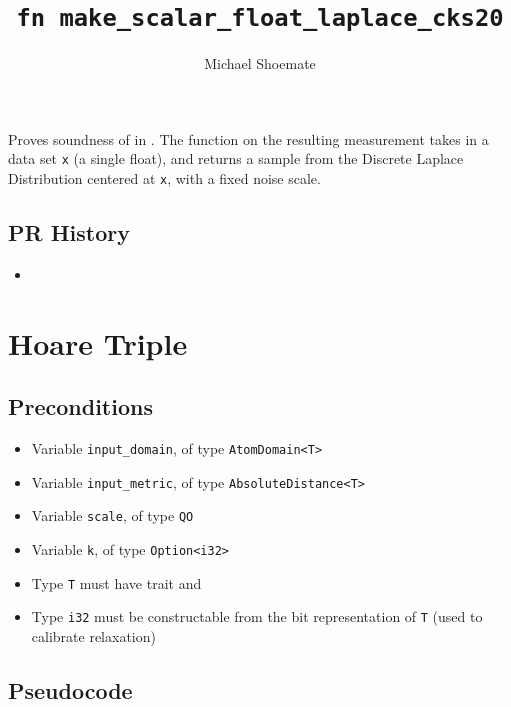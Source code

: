 \documentclass{article}
\title{\texttt{fn make\_scalar\_float\_laplace\_cks20}}
\author{Michael Shoemate}
\begin{document}
\maketitle

\contrib

Proves soundness of  in .
The function on the resulting measurement takes in a data set \texttt{x} (a single float), 
and returns a sample from the Discrete Laplace Distribution centered at \texttt{x}, with a fixed noise scale.

\subsection*{PR History}
\begin{itemize}
    \item {}
\end{itemize}

\section{Hoare Triple}

\subsection*{Preconditions}
\begin{itemize}
    \item Variable \texttt{input\_domain}, of type \texttt{AtomDomain<T>}
    \item Variable \texttt{input\_metric}, of type \texttt{AbsoluteDistance<T>}
    \item Variable \texttt{scale}, of type \texttt{QO}
    \item Variable \texttt{k}, of type \texttt{Option<i32>}
    \item Type \texttt{T} must have trait  and 
    \item Type \texttt{i32} must be constructable from the bit representation of \texttt{T} (used to calibrate relaxation)
\end{itemize}

\subsection*{Pseudocode}

\end{document}
